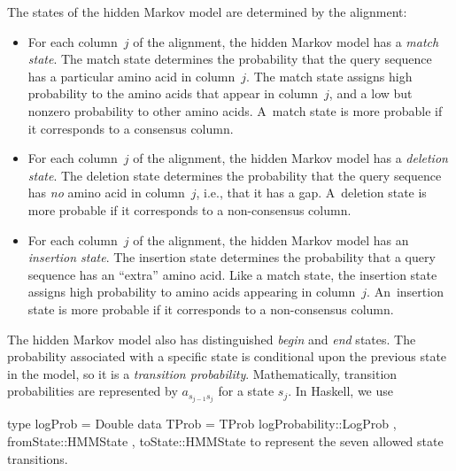 \documentclass[preprint,nonatbib,blockstyle,nocopyrightspace,times]{sigplanconf}
\newenvironment{smallverbatim}{\par\small\verbatim}{\endverbatim}
\begin{document}
The states of the hidden Markov model are determined by the alignment:
\begin{itemize}
\item
For each column~$j$ of the alignment, the hidden Markov model has a
\emph{match state}.
The match state determines the probability that the query sequence
has a particular amino acid in column~$j$.
The match state assigns high probability to the amino acids that
appear in column~$j$, and a low but nonzero probability to other amino
acids.
A~match state is more probable if it corresponds to a consensus column.
\item
For each column~$j$ of the alignment, the hidden Markov model has a
\emph{deletion state}.
The deletion state determines the probability that the query sequence
has \emph{no} amino acid  in column~$j$, i.e., that it has a gap.
A~deletion state is more probable if it corresponds to a
non-consensus column.
\item
For each column~$j$ of the alignment, the hidden Markov model has an
\emph{insertion state}.
The insertion state determines the probability that a query sequence
has an ``extra'' amino acid.
Like a match state, the insertion state assigns high probability to
amino acids appearing in column~$j$.
An~insertion state is more probable if it corresponds to a
non-consensus column.
\end{itemize}
The hidden Markov model also has distinguished \emph{begin} and \emph{end} states.
The probability associated with a specific state is conditional upon the previous
state in the model, so it is a \textit{transition probability}.
Mathematically, transition probabilities are represented by $a_{s_{j-1}s_{j}}$
for a state $s_{j}$.
In Haskell, we use 
\begin{smallverbatim}
type logProb = Double
data TProb  = TProb { logProbability::LogProb
                    , fromState::HMMState
                    , toState::HMMState
                    }
\end{smallverbatim}
to represent the seven allowed state transitions.
\end{document}
